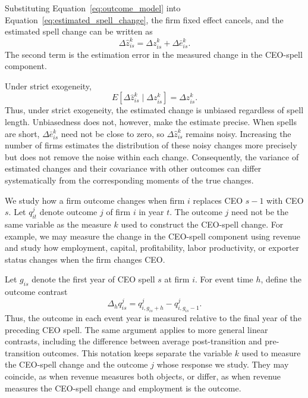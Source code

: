 \documentclass[sigconf,nonacm]{acmart}
\begin{document}
Substituting Equation~\eqref{eq:outcome_model} into
Equation~\eqref{eq:estimated_spell_change}, the firm fixed effect
cancels, and the estimated spell change can be written as
\begin{equation}
\Delta\widehat z_{is}^{k}
=
\Delta z_{is}^{k}
+
\Delta\bar e_{is}^{k}.
\label{eq:spell_change_error}
\end{equation}
The second term is the estimation error in the measured change in the CEO-spell component.

Under strict exogeneity,
\begin{equation}
E\!\left[
\Delta\widehat z_{is}^{k}
\mid
\Delta z_{is}^{k}
\right]
=
\Delta z_{is}^{k}.
\label{eq:unbiased_spell_change}
\end{equation}
Thus, under strict exogeneity, the estimated change is unbiased regardless of spell length. Unbiasedness does not, however, make the estimate precise. When spells are short, $\Delta\bar e_{is}^{k}$ need not be close to zero, so $\Delta\widehat z_{is}^{k}$ remains noisy. Increasing the number of firms estimates the distribution of these noisy changes more precisely but does not remove the noise within each change. Consequently, the variance of estimated changes and their covariance with other outcomes can differ systematically from the corresponding moments of the true changes.

We study how a firm outcome changes when firm $i$ replaces CEO 
$s-1$ with CEO $s$. Let $q_{it}^{j}$ denote outcome $j$ of firm $i$ in
year $t$. The outcome $j$ need not be the same variable as the measure
$k$ used to construct the CEO-spell change. For example, we may measure
the change in the CEO-spell component using revenue and study how
employment, capital, profitability, labor productivity, or exporter
status changes when the firm changes CEO.

Let $g_{is}$ denote the first year of CEO spell $s$ at firm $i$. For
event time $h$, define the outcome contrast
\begin{equation}
\Delta_h q_{is}^{j}
=
q_{i,g_{is}+h}^{j}
-
q_{i,g_{is}-1}^{j}.
\label{eq:outcome_contrast}
\end{equation}
Thus, the outcome in each event year is measured relative to the final
year of the preceding CEO spell. The same argument applies to more
general linear contrasts, including the difference between average
post-transition and pre-transition outcomes.
This notation keeps separate the variable $k$ used to measure the CEO-spell change and the outcome $j$ whose response we study. They may coincide, as when revenue measures both objects, or differ, as when revenue measures the CEO-spell change and employment is the outcome.
\end{document}
